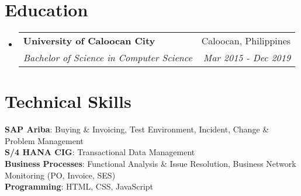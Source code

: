 \documentclass[letterpaper,11pt]{article}
\makeatletter
\newcommand{\resumeSubheading}[4]{
  \vspace{-2pt}\item
    \begin{tabular*}{0.97\textwidth}[t]{l@{\extracolsep{\fill}}r}
      \textbf{#1} & #2 \\
      \textit{\small#3} & \textit{\small #4} \\
    \end{tabular*}\vspace{-7pt}
}
\newcommand{\resumeSubHeadingListStart}{\begin{itemize}[leftmargin=0.15in, label={}]}
\newcommand{\resumeSubHeadingListEnd}{\end{itemize}}
\makeatother
\begin{document}
\section{Education}
  \resumeSubHeadingListStart
    \resumeSubheading
      {University of Caloocan City}{Caloocan, Philippines}
      {Bachelor of Science in Computer Science}{Mar 2015 - Dec 2019}
  \resumeSubHeadingListEnd

\section{Technical Skills}
 \begin{itemize}[leftmargin=0.15in, label={}]
   \small{\item{
     \textbf{SAP Ariba}{: Buying \& Invoicing, Test Environment, Incident, Change \& Problem Management} \\
     \textbf{S/4 HANA CIG}{: Transactional Data Management} \\
     \textbf{Business Processes}{: Functional Analysis \& Issue Resolution, Business Network Monitoring (PO, Invoice, SES)} \\
     \textbf{Programming}{: HTML, CSS, JavaScript}
   }}
 \end{itemize}
\end{document}
